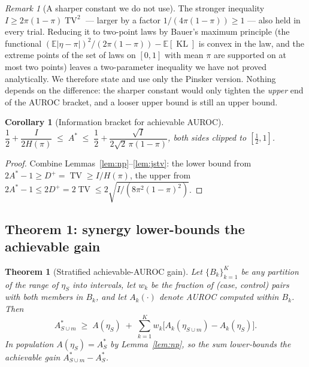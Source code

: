 \documentclass[11pt]{article}
\newtheorem{theorem}{Theorem}
\newtheorem{corollary}{Corollary}
\theoremstyle{definition}
\theoremstyle{remark}
\newtheorem{remark}{Remark}
\DeclareMathOperator{\KL}{KL}
\DeclareMathOperator{\TV}{TV}
\newcommand{\E}{\mathbb{E}}
\begin{document}
\begin{remark}[A sharper constant we do not use]
The stronger inequality $I\ge 2\pi(1-\pi)\TV^2$ --- larger by a factor
$1/(4\pi(1-\pi))\ge1$ --- also held in every trial. Reducing it to two-point laws
by Bauer's maximum principle (the functional
$(\E|\eta-\pi|)^2/(2\pi(1-\pi))-\E[\KL]$ is convex in the law, and the extreme
points of the set of laws on $[0,1]$ with mean $\pi$ are supported on at most two
points) leaves a two-parameter inequality we have not proved analytically. We
therefore state and use only the Pinsker version. Nothing depends on the
difference: the sharper constant would only tighten the \emph{upper} end of the
AUROC bracket, and a looser upper bound is still an upper bound.
\end{remark}

\begin{corollary}[Information bracket for achievable AUROC]
\label{cor:bracket}
$\dfrac12+\dfrac{I}{2H(\pi)}\;\le\;A^*\;\le\;\dfrac12+\dfrac{\sqrt I}{2\sqrt2\,\pi(1-\pi)}$,
both sides clipped to $[\tfrac12,1]$.
\end{corollary}

\begin{proof}
Combine Lemmas~\ref{lem:np}--\ref{lem:jstv}: the lower bound from
$2A^*-1\ge D^+=\TV\ge I/H(\pi)$, the upper from
$2A^*-1\le 2D^+=2\TV\le 2\sqrt{I/(8\pi^2(1-\pi)^2)}$.
\end{proof}

\subsection{Theorem 1: synergy lower-bounds the achievable gain}

\begin{theorem}[Stratified achievable-AUROC gain]
\label{thm:s-auroc}
Let $\{B_k\}_{k=1}^K$ be any partition of the range of $\eta_S$ into intervals,
let $w_k$ be the fraction of (case, control) pairs with both members in $B_k$,
and let $A_k(\cdot)$ denote AUROC computed within $B_k$. Then
\[
A^*_{S\cup m}\;\ge\;A(\eta_S)\;+\;\sum_{k=1}^{K} w_k\big[A_k(\eta_{S\cup m})-A_k(\eta_S)\big].
\]
In population $A(\eta_S)=A^*_S$ by Lemma~\ref{lem:np}, so the sum lower-bounds
the achievable gain $A^*_{S\cup m}-A^*_S$.
\end{theorem}
\end{document}
